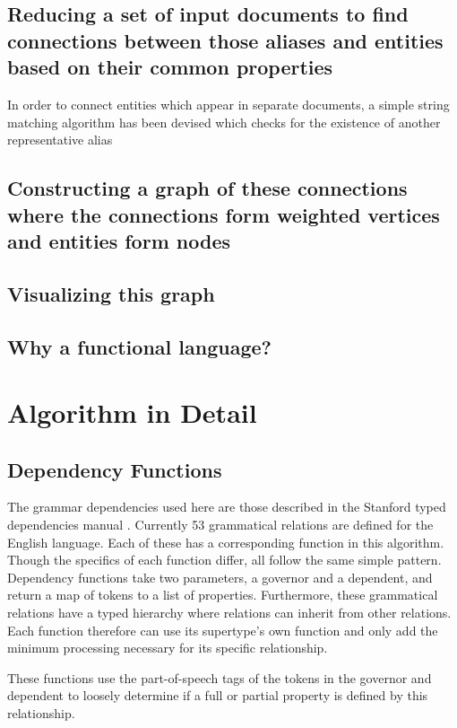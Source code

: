 \documentclass[11pt]{article}
\begin{document}
\subsection{Reducing a set of input documents to find connections between those aliases and entities based on their common properties}

In order to connect entities which appear in separate documents, a simple string matching algorithm has been devised which checks for the existence of another representative alias 

\subsection{Constructing a graph of these connections where the connections form weighted vertices and entities form nodes}

\subsection{Visualizing this graph}

\subsection{Why a functional language?}

\section{Algorithm in Detail}

\subsection{Dependency Functions}

The grammar dependencies used here are those described in the Stanford typed dependencies manual \cite{stanforddep}.  Currently 53 grammatical relations are defined for the English language.  Each of these has a corresponding function in this algorithm.  Though the specifics of each function differ, all follow the same simple pattern.  Dependency functions take two parameters, a governor and a dependent, and return a map of tokens to a list of properties.  Furthermore, these grammatical relations have a typed hierarchy where relations can inherit from other relations.  Each function therefore can use its supertype's own function and only add the minimum processing necessary for its specific relationship.

These functions use the part-of-speech tags of the tokens in the governor and dependent to loosely determine if a full or partial property is defined by this relationship.
\end{document}
